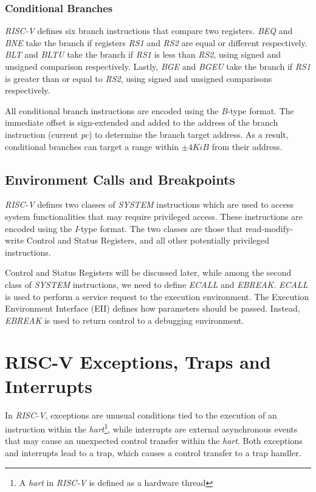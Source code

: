 \subsubsection{Conditional Branches}
\label{subsubsec:riscv_conditionalb}

\textit{RISC-V} defines six branch instructions that compare two registers. \textit{BEQ}
and \textit{BNE} take the branch if registers \textit{RS1} and \textit{RS2} are equal
or different respectively. \textit{BLT} and \textit{BLTU} take the branch if
\textit{RS1} is less than \textit{RS2}, using signed and unsigned comparison respectively.
Lastly, \textit{BGE} and \textit{BGEU} take the branch if \textit{RS1} is
greater than or equal to \textit{RS2}, using signed and unsigned comparisons
respectively.

All conditional branch instructions are encoded using the \textit{B}-type format.
The immediate offset is sign-extended and added to the address of the branch
instruction (current \textit{pc}) to determine the branch target address. As a
result, conditional branches can target a range within $\pm 4 \textit{KiB}$ from
their address.

\subsection{Environment Calls and Breakpoints}
\label{subsec:riscv_ecalls}

\textit{RISC-V} defines two classes of \textit{SYSTEM} instructions which are
used to access system functionalities that may require privileged access. These instructions
are encoded using the \textit{I}-type format. The two classes are those that read-modify-write
Control and Status Registers, and all other potentially privileged instructions.

Control and Status Registers will be discussed later, while among the second class
of \textit{SYSTEM} instructions, we need to define \textit{ECALL} and \textit{EBREAK}.
\textit{ECALL} is used to perform a service request to the execution environment.
The Execution Environment Interface (EII) defines how parameters should be
passed. Instead, \textit{EBREAK} is used to return control to a debugging environment.

\section{RISC-V Exceptions, Traps and Interrupts}
\label{sec:riscv_eti}

In \textit{RISC-V}, exceptions are unusual conditions tied to the execution of
an instruction within the \textit{hart}\footnote{A \textit{hart} in \textit{RISC-V}
is defined as a hardware thread}, while interrupts are external asynchronous events
that may cause an unexpected control transfer within the \textit{hart}. Both exceptions
and interrupts lead to a trap, which causes a control transfer to a trap handler.

